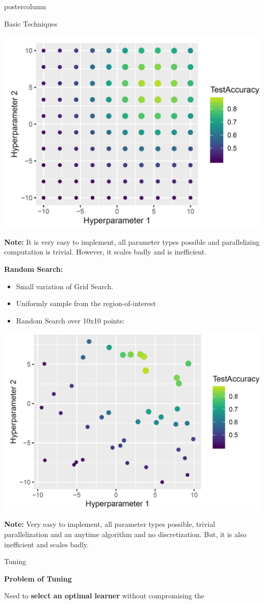 \documentclass{beamer}
\begin{document}
\begin{frame}[fragile]{}
\begin{columns}
\begin{column}{.31\textwidth}
\begin{beamercolorbox}[center]{postercolumn}
\begin{minipage}{.98\textwidth}
{\begin{myblock}{Basic Techniques}
  \begin{center}
  \includegraphics[width=0.5\columnwidth]{img/grid_1.PNG}
  \end{center}
  
  \textbf{Note:} It is very easy to implement, all parameter types possible and parallelizing computation is trivial. However, it scales badly and is inefficient.
  
  \begin{codebox}
  \textbf{Random Search:}
  \end{codebox}
  
  \begin{itemize}[$\bullet$]     
  \setlength{\itemindent}{+.3in}
  \item Small variation of Grid Search.
  \item Uniformly sample from the region-of-interest
  \item Random Search over 10x10 points:
    \end{itemize}
  
  \begin{center}
  \includegraphics[width=0.5\columnwidth]{img/rand.PNG}
  \end{center}	
  \textbf{Note:} Very easy to implement, all parameter types possible, trivial parallelization and an anytime algorithm and no discretization. But, it is also inefficient and scales badly.
  
  \end{myblock}
  
  \begin{myblock}{Tuning}
  \begin{codebox} \textbf{Problem of Tuning}	\end{codebox}
  Need to \textbf{select an optimal learner} without compromising the 
  \end{myblock}
  }
\end{minipage}
\end{beamercolorbox}
\end{column}
  

\end{columns}
\end{frame}
\end{document}
